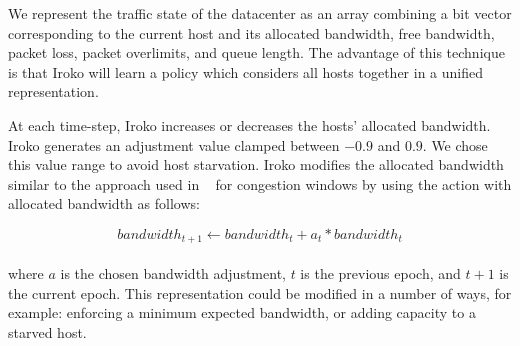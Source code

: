 We represent the traffic state of the datacenter as an array combining a bit vector
corresponding to the current host and its allocated bandwidth, free bandwidth, packet loss, packet overlimits, and queue length. 
The advantage of this technique is that Iroko will learn a policy which considers all hosts together 
in a unified representation.  

At each time-step, Iroko increases or decreases the hosts' allocated bandwidth. 
Iroko generates an adjustment value clamped between $-0.9$ and $0.9$. We chose this value range to avoid host starvation. 
Iroko modifies the allocated bandwidth similar to the approach used in ~\cite{remy} for congestion windows by using the action with allocated bandwidth as follows:

\[bandwidth_{t+1}   \leftarrow bandwidth_t +  a_t * bandwidth_t\]
\\
where $a$ is the chosen bandwidth adjustment, $t$ is the previous epoch, and $t+1$ is the current epoch. 
This representation could be  modified in a number of ways, for example: enforcing a minimum expected bandwidth, or adding capacity to a starved host.




